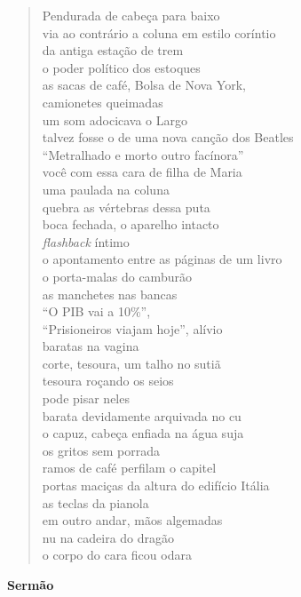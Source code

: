 \begin{verse}
Pendurada de cabeça para baixo\\
via ao contrário a coluna em estilo coríntio\\
da antiga estação de trem\\
o poder político dos estoques\\[5pt]
as sacas de café, Bolsa de Nova York,\\
camionetes queimadas\\
um som adocicava o Largo\\
talvez fosse o de uma nova canção dos Beatles\\[5pt]
``Metralhado e morto outro facínora''\\
você com essa cara de filha de Maria\\
uma paulada na coluna\\
quebra as vértebras dessa puta\\[5pt]
boca fechada, o aparelho intacto\\
\emph{flashback} íntimo\\
o apontamento entre as páginas de um livro\\
o porta-malas do camburão\\[5pt]
as manchetes nas bancas\\
``O PIB vai a 10\%'',\\
``Prisioneiros viajam hoje'', alívio\\
baratas na vagina\\[5pt]
corte, tesoura, um talho no sutiã\\
tesoura roçando os seios\\
pode pisar neles\\
barata devidamente arquivada no cu\\[5pt]
o capuz, cabeça enfiada na água suja\\
os gritos sem porrada\\
ramos de café perfilam o capitel\\
portas maciças da altura do edifício Itália\\[5pt]
as teclas da pianola\\
em outro andar, mãos algemadas\\
nu na cadeira do dragão\\
o corpo do cara ficou odara
\end{verse}

\pagebreak

\textbf{Sermão}

